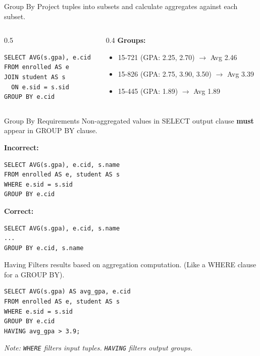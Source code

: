\documentclass[aspectratio=169]{beamer}
\begin{document}
\begin{frame}[fragile]{Group By}
    Project tuples into subsets and calculate aggregates against each subset.
    
    \begin{columns}
        \begin{column}{0.5\textwidth}
        \begin{lstlisting}
SELECT AVG(s.gpa), e.cid
FROM enrolled AS e 
JOIN student AS s
  ON e.sid = s.sid
GROUP BY e.cid
        \end{lstlisting}
        \end{column}
        \begin{column}{0.4\textwidth}
            \scriptsize
            \textbf{Groups:}
            \begin{itemize}
                \item 15-721 (GPA: 2.25, 2.70) $\rightarrow$ Avg 2.46
                \item 15-826 (GPA: 2.75, 3.90, 3.50) $\rightarrow$ Avg 3.39
                \item 15-445 (GPA: 1.89) $\rightarrow$ Avg 1.89
            \end{itemize}
        \end{column}
    \end{columns}
\end{frame}

\begin{frame}[fragile]{Group By Requirements}
    Non-aggregated values in SELECT output clause \textbf{must} appear in GROUP BY clause.
    
    \textbf{Incorrect:}
    \begin{lstlisting}
SELECT AVG(s.gpa), e.cid, s.name
FROM enrolled AS e, student AS s
WHERE e.sid = s.sid
GROUP BY e.cid
    \end{lstlisting}
    
    \textbf{Correct:}
    \begin{lstlisting}
SELECT AVG(s.gpa), e.cid, s.name
...
GROUP BY e.cid, s.name
    \end{lstlisting}
\end{frame}

\begin{frame}[fragile]{Having}
    Filters results based on aggregation computation. (Like a WHERE clause for a GROUP BY).
    
    \begin{lstlisting}
SELECT AVG(s.gpa) AS avg_gpa, e.cid
FROM enrolled AS e, student AS s
WHERE e.sid = s.sid
GROUP BY e.cid
HAVING avg_gpa > 3.9;
    \end{lstlisting}
    
    \textit{Note: \texttt{WHERE} filters input tuples. \texttt{HAVING} filters output groups.}
\end{frame}
\end{document}
